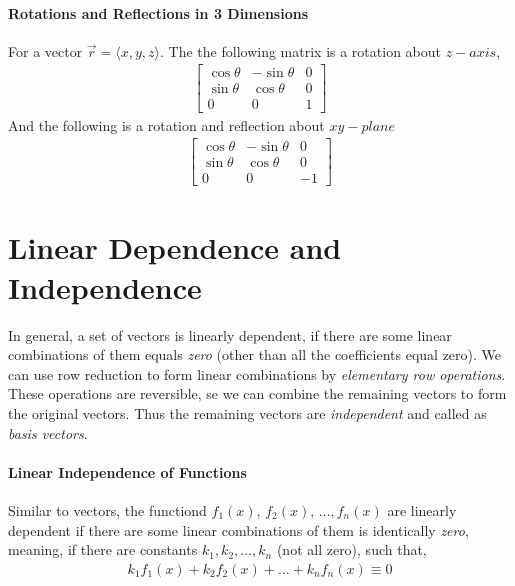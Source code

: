             \paragraph{Rotations and Reflections in 3 Dimensions} %
            \label{par:Rotations and Reflections in 3 Dimensions}
            For a vector $ \vec{r} = \langle x, y, z \rangle$. The the following matrix is a rotation about $z-axis$,
            \begin{align}
                \label{eq:rotation about z}
                \begin{bmatrix}
                    \cos{\theta} & -\sin{\theta} & 0 \\
                    \sin{\theta} & \cos{\theta} & 0 \\
                    0 & 0 & 1
                \end{bmatrix}
            \end{align}
            And the following is a rotation and reflection about $xy-plane$
            \begin{align}
                \label{eq:rotationa z and reflection in xy}
                \begin{bmatrix}
                    \cos{\theta} & -\sin{\theta} & 0 \\
                    \sin{\theta} & \cos{\theta} & 0 \\
                    0 & 0 & -1
                \end{bmatrix}
            \end{align}

        
            
        \section{Linear Dependence and Independence}

            In general, a set of vectors is linearly dependent, if  there are some linear combinations of them equals \textit{zero} (other than all the coefficients 
            equal zero). We can use row reduction to form linear combinations by \textit{elementary row operations}. These operations are reversible, se we can combine
            the remaining vectors to form the original vectors. Thus the remaining vectors are \textit{independent} and called as \textit{basis vectors}.

            \paragraph{Linear Independence of Functions} %
            \label{par:Linear Independence of Functions}
            Similar to vectors, the functiond $f_1(x),\, f_2(x),\, \dots , f_n(x)$ are linearly dependent if there are some linear combinations of them is identically
            \textit{zero}, meaning, if there are constants $k_1, k_2, \dots , k_n$ (not all zero), such that,
            \begin{align*}
                k_1 f_1(x) + k_2 f_2(x) + \dots +k_n f_n(x) \equiv 0
            \end{align*}

